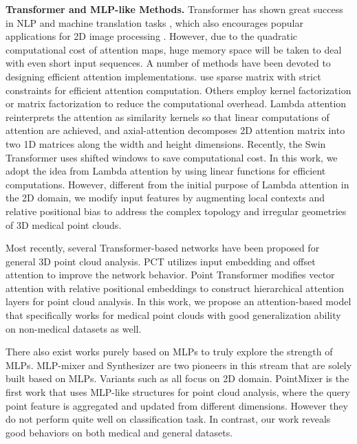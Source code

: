 \documentclass[10pt,twocolumn,letterpaper]{article}
\begin{document}
\noindent \textbf{Transformer and MLP-like Methods.}
Transformer \cite{vaswani2017attention} has shown great success in NLP and machine translation tasks \cite{bert,xlnmet,vaswani2017attention}, which also encourages popular applications for 2D image processing \cite{img16,kolesnikov2019big,detr,Vit, liu2021Swin}.
However, due to the quadratic computational cost of attention maps, huge memory space will be taken to deal with even short input sequences.
A number of methods have been devoted to designing efficient attention implementations. \cite{roy2020efficient, child2019generating, kitaev2020reformer} use sparse matrix with strict constraints for efficient attention computation. Others \cite{performer, lambdanetworks, katharopoulos2020, axial} employ kernel factorization or matrix factorization to reduce the computational overhead.
Lambda attention \cite{lambdanetworks} reinterprets the attention as similarity kernels so that linear computations of attention are achieved, and axial-attention \cite{axial} decomposes 2D attention matrix into two 1D matrices along the width and height dimensions.
Recently, the Swin Transformer \cite{liu2021Swin} uses shifted windows to save computational cost.
In this work, we adopt the idea from Lambda attention by using linear functions for efficient computations.
However, different from the initial purpose of Lambda attention in the 2D domain, we modify input features by augmenting local contexts and relative positional bias to address the complex topology and irregular geometries of 3D medical point clouds.

Most recently, several Transformer-based networks have been proposed for general 3D point cloud analysis.
PCT \cite{guo2020pct} utilizes input embedding and offset attention to improve the network behavior.
Point Transformer \cite{pt} modifies vector attention with relative positional embeddings to construct hierarchical attention layers for point cloud analysis.
In this work, we propose an attention-based model that specifically works for medical point clouds with good generalization ability on non-medical datasets as well. 

There also exist works purely based on MLPs to truly explore the strength of MLPs.
MLP-mixer \cite{mlp-mixer} and Synthesizer \cite{tay2021synthesizer} are two pioneers in this stream that are solely built based on MLPs.
Variants such as \cite{chen2021cyclemlp,yu2021s,touvron2021resmlp} all focus on 2D domain.
PointMixer \cite{choe2021pointmixer} is the first work that uses MLP-like structures for point cloud analysis, where the query point feature is aggregated and updated from different dimensions.
However they do not perform quite well on classification task.
In contrast, our work reveals good behaviors on both medical and general datasets.
\end{document}
